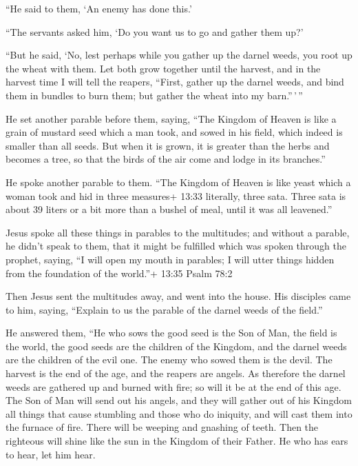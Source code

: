  ``He said to them, `An enemy has done this.'

``The servants asked him, `Do you want us to go and gather them up?'

 ``But he said, `No, lest perhaps while you gather up the
darnel weeds, you root up the wheat with them.  Let both
grow together until the harvest, and in the harvest time I will tell the
reapers, ``First, gather up the darnel weeds, and bind them in bundles
to burn them; but gather the wheat into my barn.''\,'\,''

 He set another parable before them, saying, ``The Kingdom
of Heaven is like a grain of mustard seed which a man took, and sowed in
his field,  which indeed is smaller than all seeds. But
when it is grown, it is greater than the herbs and becomes a tree, so
that the birds of the air come and lodge in its branches.''

 He spoke another parable to them. ``The Kingdom of Heaven
is like yeast which a woman took and hid in three measures+ 13:33
literally, three sata. Three sata is about 39 liters or a bit more than
a bushel of meal, until it was all leavened.''

 Jesus spoke all these things in parables to the
multitudes; and without a parable, he didn't speak to them,
 that it might be fulfilled which was spoken through the
prophet, saying, ``I will open my mouth in parables; I will utter things
hidden from the foundation of the world.''+ 13:35 Psalm 78:2

 Then Jesus sent the multitudes away, and went into the
house. His disciples came to him, saying, ``Explain to us the parable of
the darnel weeds of the field.''

 He answered them, ``He who sows the good seed is the Son
of Man,  the field is the world, the good seeds are the
children of the Kingdom, and the darnel weeds are the children of the
evil one.  The enemy who sowed them is the devil. The
harvest is the end of the age, and the reapers are angels. 
As therefore the darnel weeds are gathered up and burned with fire; so
will it be at the end of this age.  The Son of Man will
send out his angels, and they will gather out of his Kingdom all things
that cause stumbling and those who do iniquity,  and will
cast them into the furnace of fire. There will be weeping and gnashing
of teeth.  Then the righteous will shine like the sun in
the Kingdom of their Father. He who has ears to hear, let him hear.

